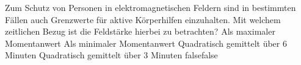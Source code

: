     {Zum Schutz von Personen in elektromagnetischen Feldern sind in bestimmten Fällen auch Grenzwerte für aktive Körperhilfen einzuhalten. Mit welchem zeitlichen Bezug ist die Feldstärke hierbei zu betrachten?}
    {Als maximaler Momentanwert}
    {Als minimaler Momentanwert}
    {Quadratisch gemittelt über 6 Minuten}
    {Quadratisch gemittelt über 3 Minuten}
    {false}{false}